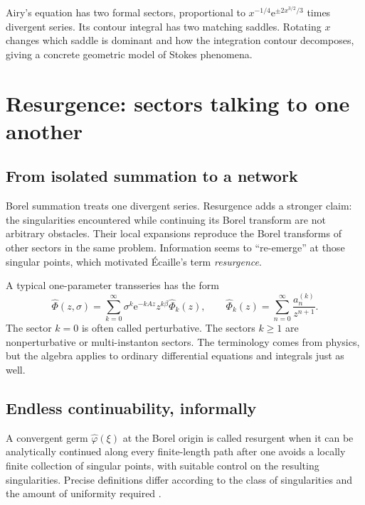 \documentclass[11pt,oneside]{book}
\theoremstyle{definition}
\theoremstyle{remark}
\newcommand{\e}{\mathrm{e}}
\newcommand{\phihat}{\widehat{\Phi}}
\begin{document}
\begin{summarybox}
Airy's equation has two formal sectors, proportional to
$x^{-1/4}\e^{\pm2x^{3/2}/3}$ times divergent series. Its contour integral has two
matching saddles. Rotating $x$ changes which saddle is dominant and how the
integration contour decomposes, giving a concrete geometric model of Stokes
phenomena.
\end{summarybox}


\chapter{Resurgence: sectors talking to one another}
\label{ch:resurgence}

\section{From isolated summation to a network}

Borel summation treats one divergent series. Resurgence adds a stronger claim:
the singularities encountered while continuing its Borel transform are not
arbitrary obstacles. Their local expansions reproduce the Borel transforms of
other sectors in the same problem. Information seems to ``re-emerge'' at those
singular points, which motivated \'Ecaille's term \emph{resurgence}.

A typical one-parameter transseries has the form
\begin{equation}
  \widehat\Phi(z,\sigma)
  =\sum_{k=0}^{\infty}
    \sigma^k\e^{-kAz}z^{k\beta}\phihat_k(z),
  \qquad
  \phihat_k(z)=\sum_{n=0}^{\infty}\frac{a_n^{(k)}}{z^{n+1}}.
  \label{eq:one-parameter-resurgent-transseries}
\end{equation}
The sector $k=0$ is often called perturbative. The sectors $k\ge1$ are
nonperturbative or multi-instanton sectors. The terminology comes from physics,
but the algebra applies to ordinary differential equations and integrals just
as well.

\section{Endless continuability, informally}

A convergent germ $\widehat\varphi(\xi)$ at the Borel origin is called resurgent
when it can be analytically continued along every finite-length path after one
avoids a locally finite collection of singular points, with suitable control on
the resulting singularities. Precise definitions differ according to the class
of singularities and the amount of uniformity required
\cite{EcalleResurgent,SauzinIntro,DorigoniIntro}.
\end{document}
